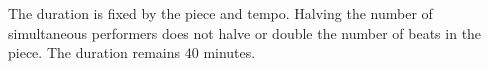 The duration is fixed by the piece and tempo. Halving the number of simultaneous performers does not halve or double the number of beats in the piece. The duration remains $\boxed{40}$ minutes.
